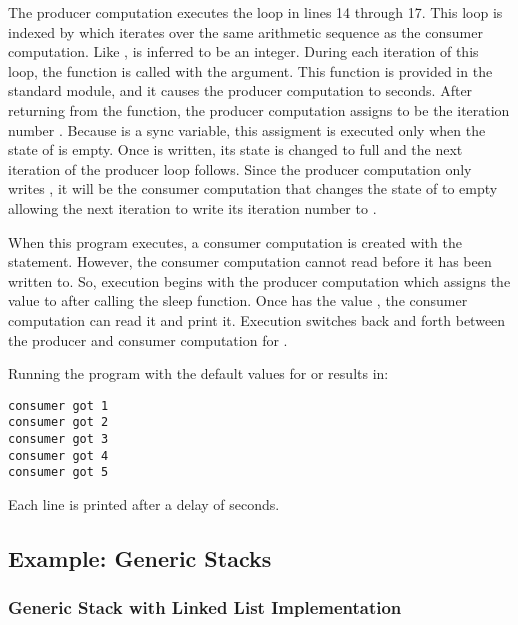 The producer computation executes the  loop in lines 14 through 17.  This
loop is indexed by  which iterates over the same arithmetic sequence
as the consumer computation.  Like ,  is inferred to be an integer.
During each iteration of this  loop, the  function is
called with the argument.  This  function is provided
in the  standard module, and it causes the producer computation to
 seconds.  After returning from the  function, 
the producer computation assigns  to be the iteration number .  
Because  is a sync variable, this assigment is executed only when the state of 
 is empty.  Once  is written, its state is changed to full and the
next iteration of the producer loop follows.  Since the producer computation only
writes , it will be the consumer computation that changes the state of
 to empty allowing the next iteration to write its iteration number
to .

When this program executes, a consumer computation is created with the 
statement.
However, the consumer computation cannot read  before it has been written
to.  So, execution begins with the producer computation which assigns the value
 to  after calling the sleep function.  Once  has the
value , the consumer computation can read it and print it.  Execution
switches back and forth between the producer and consumer computation for
.  

Running the program with the default 
values for  or  results in: 
\begin{verbatim}
consumer got 1
consumer got 2
consumer got 3
consumer got 4
consumer got 5
\end{verbatim}
Each line is printed after a delay of  seconds.


\subsection{Example: Generic Stacks}

\subsubsection{Generic Stack with Linked List Implementation}

